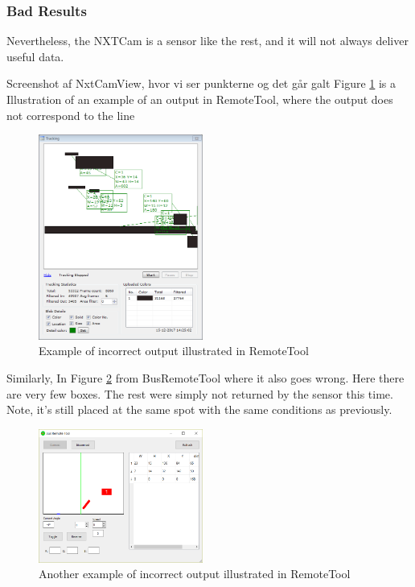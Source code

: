 \subsubsection{Bad Results}
Nevertheless, the NXTCam is a sensor like the rest, and it will not always deliver useful data. 

Screenshot af NxtCamView, hvor vi ser punkterne og det går galt
Figure \ref{fig:RemoteToolOutput2} is a Illustration of an example of an output in RemoteTool, where the output does not correspond to the line 
\begin{figure}[H]
    \centering
    \includegraphics[width=0.48\textwidth]{Images/Analysis/NXTCamTesting/NXTCamView_Boxes_2.png}
    \caption{Example of incorrect output illustrated in RemoteTool}
    \label{fig:RemoteToolOutput2}
\end{figure}



Similarly, In Figure \ref{fig:RemoteToolOutput3} from BusRemoteTool where it also goes wrong. Here there are very few boxes. The rest were simply not returned by the sensor this time. Note, it's still placed at the same spot with the same conditions as previously.
\begin{figure}[H]
    \centering
    \includegraphics[width=0.48\textwidth]{Images/Analysis/NXTCamTesting/BusRemoteTool_Few.png}
    \caption{Another example of incorrect output illustrated in RemoteTool}
    \label{fig:RemoteToolOutput3}
\end{figure}



